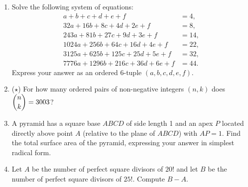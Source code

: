 \documentclass{article}
\begin{document}
\begin{enumerate}
\item Solve the following system of equations:
\begin{align*}
a + b + c + d + e + f &= 4, \\
32a + 16b + 8c + 4d + 2e + f &= 8, \\
243a + 81b + 27c + 9d + 3e + f &= 14, \\
1024a + 256b + 64c + 16d + 4e + f &= 22, \\
3125a + 625b + 125c + 25d + 5e + f &= 32, \\
7776a + 1296b + 216c + 36d + 6e + f &= 44.
\end{align*}
Express your answer as an ordered 6-tuple $(a,b,c,d,e,f)$.\vspace{3cm}
\item ($\star$) For how many ordered pairs of non-negative integers $(n,k)$ does $\dbinom{n}{k} = 3003$?\vspace{3cm}
\item A pyramid has a square base $ABCD$ of side length 1 and an apex $P$ located directly above point $A$ (relative to the plane of $ABCD$) with $AP = 1$. Find the total surface area of the pyramid, expressing your answer in simplest radical form.\vspace{3cm}
\item Let $A$ be the number of perfect square divisors of $20!$ and let $B$ be the number of perfect square divisors of $25!$. Compute $B - A$.
\end{enumerate}
\end{document}
